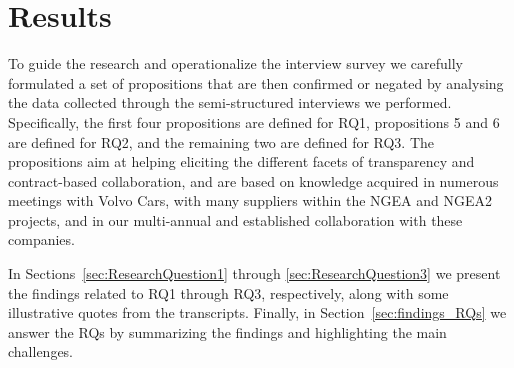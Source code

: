 \section{Results}\label{sec:results}


To guide the research and operationalize the interview survey %
we carefully formulated a set of propositions that are then confirmed or negated by analysing the data collected through the semi-structured interviews we performed. Specifically, the first four propositions are defined for RQ1, propositions  5 and 6 are defined for RQ2,  and the remaining two are defined for RQ3.
The propositions aim at helping eliciting the different facets of transparency and contract-based collaboration, and are based on knowledge acquired in numerous meetings with Volvo Cars, with many suppliers within the NGEA and NGEA2 projects, and in our multi-annual and established collaboration with these companies. %



{In Sections~\ref{sec:ResearchQuestion1} through \ref{sec:ResearchQuestion3} we present the findings related to RQ1 through RQ3, respectively, along with some illustrative quotes from the transcripts. Finally,}
 in Section~\ref{sec:findings_RQs} we answer the RQs by summarizing the findings and highlighting the main challenges.

